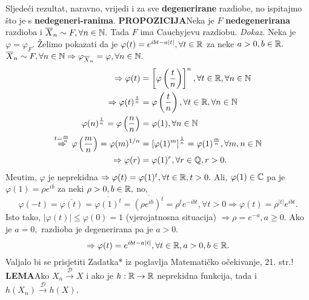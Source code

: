 \documentclass{article}
\begin{document}
\begin{enumerate}
\end{enumerate} Sljedeći rezultat, naravno, vrijedi i za sve \textbf{degenerirane} razdiobe, no ispitajmo što je s \textbf{nedegeneri-}\newline\textbf{ranima}.\newline\newline
\textbf{PROPOZICIJA}\newline Neka je \(F\) \textbf{nedegenerirana} razdioba i \(\overline X_n\sim F,\forall n\in\Bbb N.\) Tada \(F\) ima Cauchyjevu razdiobu.\newline\newline
\textit{Dokaz.}\newline
Neka je \(\varphi=\varphi_F.\) Želimo pokazati da je \(\varphi(t)=e^{ibt-a|t|},\forall t\in\Bbb R\) za neke \(a>0,b\in\Bbb R.\)\newline \(\overline X_n\sim F,\forall n\in\Bbb N\Rightarrow\varphi_{\overline X_n}=\varphi,\forall n\in\Bbb N.\) \[\begin{aligned}\Rightarrow\varphi(t)&=\left[\varphi\left(\frac{t}n\right)\right]^n,\forall t\in\Bbb R,\forall n\in\Bbb N\\\Rightarrow\varphi(t)^{\frac1n}&=\varphi\left(\frac{t}n\right),\forall t\in\Bbb R,\forall n\in\Bbb N\\\varphi(n)^{\frac1n}=\varphi\left(\frac{n}n\right)&=\varphi(1),\forall n\in\Bbb N\\\overset{t=\frac{m}n}{\Rightarrow}\varphi\left(\frac{m}n\right)=\varphi(m)^{1/n}&=\left[\varphi(1)^m\right]^{\frac1n}=\varphi(1)^{\frac{m}n},\forall m,n\in\Bbb N\\\Rightarrow\varphi(r)&=\varphi(1)^r,\forall r\in\Bbb Q,r>0.\end{aligned}\] Me\dj{}utim, \(\varphi\) je neprekidna \(\Rightarrow\varphi(t)=\varphi(1)^t,\forall t\in\Bbb R,t>0.\) Ali, \(\varphi(1)\in\Bbb C\) pa je \(\varphi(1)=\rho e^{ib}\) za neki \(\rho>0,b\in\Bbb R,\) no, \[\varphi(-t)=\overline{\varphi(t)}=\overline{\varphi(1)^t}=\overline{\left(\rho e^{ib}\right)^t}=\rho^te^{-ibt},\forall t>0\Rightarrow\varphi(t)=\rho^{|t|}e^{ibt}.\] Isto tako, \(|\varphi(t)|\le\varphi(0)=1\) (vjerojatnosna situacija) \(\Rightarrow\rho=e^{-a},a\ge 0.\) Ako je \(a=0,\) razdioba je degenerirana pa je \(a>0.\) \[\Rightarrow\varphi(t)=e^{ibt-a|t|},\forall t\in\Bbb R,a>0,b\in\Bbb R.\]
Valjalo bi se prisjetiti Zadatka* iz poglavlja \textsection Matematičko očekivanje, 21. str.!\newline
\textbf{LEMA}\newline Ako \(X_n\overset{\mathcal D}{\longrightarrow}X\) i ako je \(h:\Bbb R\to\Bbb R\) neprekidna funkcija, tada i \(h(X_n)\overset{\mathcal D}{\longrightarrow}h(X).\)\newline\newline
\end{document}
